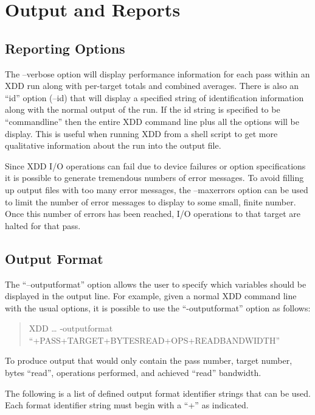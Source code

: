 \newpage
\section{Output and Reports}\label{output-and-reports}

\subsection{Reporting Options}\label{reporting-options}

The --verbose option will display performance information for each pass within an XDD run along with per-target totals and combined averages. There is also an ``id'' option (--id) that will display a specified string of identification information along with the normal output of the run. If the id string is specified to be ``commandline'' then the entire XDD command line plus all the options will be display. This is useful when running XDD from a shell script to get more qualitative information about the run into the output file.

Since XDD I/O operations can fail due to device failures or option specifications it is possible to generate tremendous numbers of error messages. To avoid filling up output files with too many error messages, the --maxerrors option can be used to limit the number of error messages to display to some small, finite number. Once this number of errors has been reached, I/O operations to that target are halted for that pass.

\subsection{Output Format}\label{output-format}

The ``--outputformat'' option allows the user to specify which variables should be displayed in the output line. For example, given a normal XDD command line with the usual options, it is possible to use the ``-outputformat'' option as follows:

\begin{quote}
XDD \ldots{} -outputformat ``+PASS+TARGET+BYTESREAD+OPS+READBANDWIDTH''
\end{quote}

To produce output that would only contain the pass number, target number, bytes ``read'', operations performed, and achieved ``read'' bandwidth.

The following is a list of defined output format identifier strings that can be used. Each format identifier string must begin with a ``+'' as indicated.


